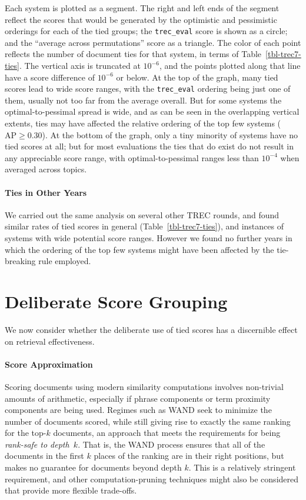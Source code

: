 \documentclass[runningheads,a4paper]{llncs}
\newcommand{\myparagraph}[1]{\vspace*{-0.7ex}\paragraph*{\normalsize\bf{#1}}}
\newcommand{\treceval}{{\tt\small{trec\_eval}}}
\begin{document}
Each system is plotted as a segment.
The right and left ends of the segment reflect the scores that would
be generated by the optimistic and pessimistic orderings for each of
the tied groups; the {\treceval} score is shown as a circle; and the
``average across permutations'' score as a triangle.
The color of each point reflects the number of document ties for that
system, in terms of Table~\ref{tbl-trec7-ties}.
The vertical axis is truncated at $10^{-6}$, and the points plotted
along that line have a score difference of $10^{-6}$ or below.
At the top of the graph, many tied scores lead to wide score ranges,
with the {\treceval} ordering being just one of them, usually not too
far from the average overall.
But for some systems the optimal-to-pessimal spread is wide, and as
can be seen in the overlapping vertical extents, ties may have
affected the relative ordering of the top few systems ($\mbox{AP}\ge
0.30$).
At the bottom of the graph, only a tiny minority of systems have no
tied scores at all; but for most evaluations the ties that do exist
do not result in any appreciable score range, with
optimal-to-pessimal ranges less than $10^{-4}$ when averaged across
topics.


\myparagraph{Ties in Other Years}

We carried out the same analysis on several other TREC rounds, and
found similar rates of tied scores in general
(Table~\ref{tbl-trec7-ties}), and instances of systems with wide
potential score ranges.
However we found no further years in which the ordering of the
top few systems might have been affected by the tie-breaking rule
employed.


 \section{Deliberate Score Grouping}
\label{sec-roundingoff}

We now consider whether the deliberate use of tied scores
has a discernible effect on retrieval effectiveness.

\myparagraph{Score Approximation}

Scoring documents using modern similarity computations involves
non-trivial amounts of arithmetic, especially if phrase components or
term proximity components are being used.
Regimes such as WAND {\citep{bchsz03cikm}} seek to minimize the
number of documents scored, while still giving rise to exactly the
same ranking for the top-$k$ documents, an approach that meets the
requirements for being {\emph{rank-safe to depth~$k$}}.
That is, the WAND process ensures that all of the documents in the
first $k$ places of the ranking are in their right positions, but
makes no guarantee for documents beyond depth $k$.
This is a relatively stringent requirement, and other
computation-pruning techniques might also be considered that provide
more flexible trade-offs.
\end{document}
